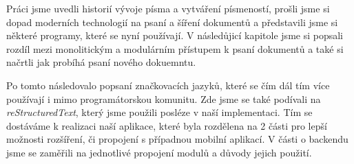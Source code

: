 Práci jsme uvedli historií vývoje písma a vytváření písmeností, prošli jsme si dopad moderních technologií na psaní a šíření dokumentů a představili jsme si
některé programy, které se nyní používají. V následůjicí kapitole jsme si popsali rozdíl mezi monolitickým a modulárním přístupem k psaní dokumentů a také si
načrtli jak probíhá psaní nového dokuemntu.

Po tomto následovalo popsaní značkovacích jazyků, které se čím dál tím více používají i mimo programátorskou komunitu. Zde jsme se také podívali na
\textit{reStructuredText}, který jsme použili posléze v naší implementaci. Tím se dostáváme k realizaci naší aplikace, které byla rozdělena na 2 části
pro lepší možnosti rozšíření, či propojení s případnou mobilní aplikací. V části o backendu jsme se zaměřili na jednotlivé propojení modulů a důvody jejich
použití.